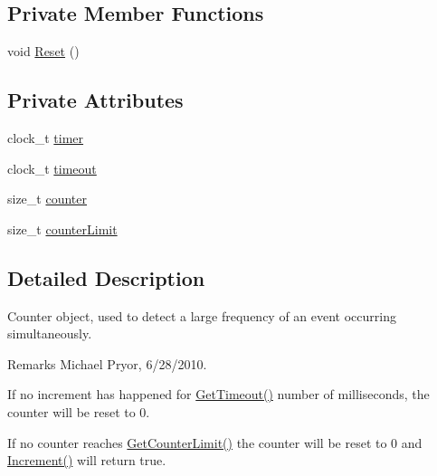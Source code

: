 \subsection*{Private Member Functions}
\begin{DoxyCompactItemize}
\item 
void \hyperlink{classcl_counter_aad21a0325c03b06b83ff7cb522f2fff6}{Reset} ()
\end{DoxyCompactItemize}
\subsection*{Private Attributes}
\begin{DoxyCompactItemize}
\item 
clock\_\-t \hyperlink{classcl_counter_ab4657d871c04c73f93cfb223401ee6f4}{timer}
\item 
clock\_\-t \hyperlink{classcl_counter_a68b6f9e1cef533810d5cfff1cdffa35a}{timeout}
\item 
size\_\-t \hyperlink{classcl_counter_af04adc8de643f218ad5e4b5ecefa676f}{counter}
\item 
size\_\-t \hyperlink{classcl_counter_aa16f1572cf9580b6c699943d678a30fc}{counterLimit}
\end{DoxyCompactItemize}


\subsection{Detailed Description}
Counter object, used to detect a large frequency of an event occurring simultaneously. \begin{DoxyRemark}{Remarks}
Michael Pryor, 6/28/2010.
\end{DoxyRemark}
If no increment has happened for \hyperlink{classcl_counter_a7f36a3f9fed50ecbe3f5689f13fa09c4}{GetTimeout()} number of milliseconds, the counter will be reset to 0. \par
 If no counter reaches \hyperlink{classcl_counter_a506ebc846490f4b229b53e920b27a869}{GetCounterLimit()} the counter will be reset to 0 and \hyperlink{classcl_counter_aeb2420e725a16524177bfba91238461d}{Increment()} will return true. 

